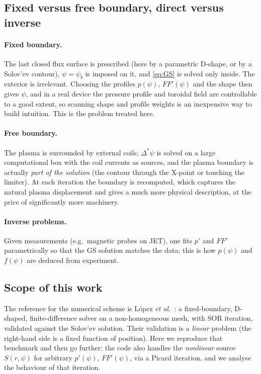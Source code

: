\documentclass[11pt,a4paper]{article}
\newcommand{\Dstar}{\Delta^{\!*}}
\begin{document}
\subsection{Fixed versus free boundary, direct versus inverse}
\paragraph{Fixed boundary.} The last closed flux surface is prescribed (here by a parametric D-shape, or by a Solov'ev contour), $\psi=\psi_b$ is imposed on it, and \eqref{eq:GS} is solved only inside. The exterior is irrelevant. Choosing the profiles $p(\psi)$, $FF'(\psi)$ and the shape then gives $\psi$, and in a real device the pressure profile and toroidal field are controllable to a good extent, so scanning shape and profile weights is an inexpensive way to build intuition. This is the problem treated here.
\paragraph{Free boundary.} The plasma is surrounded by external coils; $\Dstar\psi$ is solved on a large computational box with the coil currents as sources, and the plasma boundary is actually \emph{part of the solution} (the contour through the X-point or touching the limiter). At each iteration the boundary is recomputed, which captures the natural plasma displacement and gives a much more physical description, at the price of significantly more machinery.
\paragraph{Inverse problems.} Given measurements (e.g.\ magnetic probes on JET), one fits $p'$ and $FF'$ parametrically so that the GS solution matches the data; this is how $p(\psi)$ and $f(\psi)$ are deduced from experiment.

\subsection{Scope of this work}
The reference for the numerical scheme is L\'opez \emph{et al.}~\cite{lopez2019}: a fixed-boundary, D-shaped, finite-difference solver on a non-homogeneous mesh, with SOR iteration, validated against the Solov'ev solution. Their validation is a \emph{linear} problem (the right-hand side is a fixed function of position). Here we reproduce that benchmark and then go further: the code also handles the \emph{nonlinear} source $S(r,\psi)$ for arbitrary $p'(\psi)$, $FF'(\psi)$, via a Picard iteration, and we analyse the behaviour of that iteration.
\end{document}
